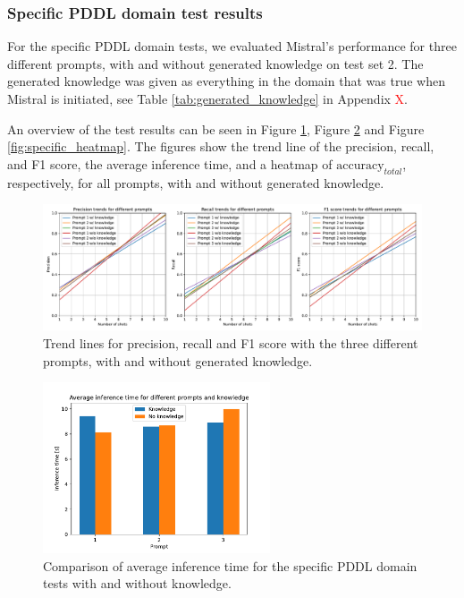 \subsubsection{Specific PDDL domain test results}
For the specific PDDL domain tests, we evaluated Mistral's performance for three different prompts, with and without generated knowledge on test set 2. The generated knowledge was given as everything in the domain that was true when Mistral is initiated, see Table \ref{tab:generated_knowledge} in Appendix \textcolor{red}{X}.

An overview of the test results can be seen in Figure \ref{fig:specific_all_metrics_trend}, Figure \ref{fig:specific_avg_inf_time} and Figure \ref{fig:specific_heatmap}. The figures show the trend line of the precision, recall, and F1 score, the average inference time, and a heatmap of $\text{accuracy}_{total}$, respectively, for all prompts, with and without generated knowledge. 

\begin{figure}[h]
    \centering
    \includegraphics[width=\textwidth]{figures/specific_all_metrics_trend.pdf}
    \caption[Specific PDDL domain trend lines for precision, recall and F1 score]{Trend lines for precision, recall and F1 score with the three different prompts, with and without generated knowledge.}
    \label{fig:specific_all_metrics_trend}
\end{figure}

\begin{figure}[h]
    \centering
    \includegraphics[width=0.6\textwidth]{figures/specific_avg_inf_time.pdf}
    \caption[Specific PDDL domain average inference time]{Comparison of average inference time for the specific PDDL domain tests with and without knowledge.}
    \label{fig:specific_avg_inf_time}
\end{figure}

